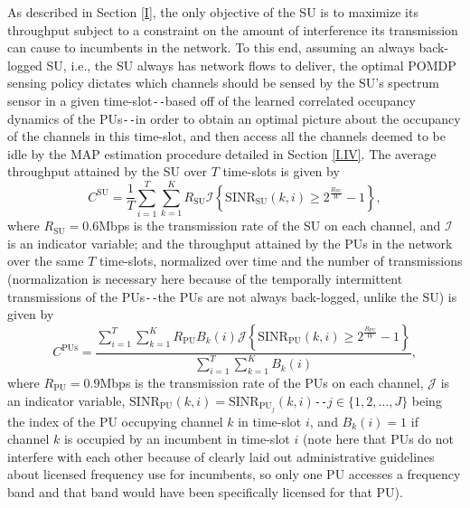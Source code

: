 \documentclass[12pt, draftcls, onecolumn]{IEEEtran}
\begin{document}
As described in Section \ref{I}, the only objective of the SU is to maximize its throughput subject to a constraint on the amount of interference its transmission can cause to incumbents in the network. To this end, assuming an always back-logged SU, i.e., the SU always has network flows to deliver, the optimal POMDP sensing policy dictates which channels should be sensed by the SU's spectrum sensor in a given time-slot\texttt{-{}-}based off of the learned correlated occupancy dynamics of the PUs\texttt{-{}-}in order to obtain an optimal picture about the occupancy of the channels in this time-slot, and then access all the channels deemed to be idle by the MAP estimation procedure detailed in Section \ref{I.IV}. The average throughput attained by the SU over $T$ time-slots is given by
\begin{equation}\label{30}
    C^{\text{SU}}=\frac{1}{T}\sum_{i=1}^{T}\sum_{k=1}^{K}R_{\text{SU}}\mathcal{I}\left\{\text{SINR}_{\text{SU}}(k,i) \geq 2^{\frac{R_{\text{SU}}}{W}}-1\right\},
\end{equation}
where $R_{\text{SU}}{=}0.6$Mbps is the transmission rate of the SU on each channel, and $\mathcal{I}$ is an indicator variable; and the throughput attained by the PUs in the network over the same $T$ time-slots, normalized over time and the number of transmissions (normalization is necessary here because of the temporally intermittent transmissions of the PUs\texttt{-{}-}the PUs are not always back-logged, unlike the SU) is given by
\begin{equation}\label{31}
    C^{\text{PUs}}=\frac{\sum_{i=1}^{T}\sum_{k=1}^{K}R_{\text{PU}}B_{k}(i)\mathcal{J}\left\{\text{SINR}_{\text{PU}}(k,i) \geq 2^{\frac{R_{\text{PU}}}{W}}-1\right\}}{\sum_{i=1}^{T}\sum_{k=1}^{K}B_{k}(i)},
\end{equation}
where $R_{\text{PU}}{=}0.9$Mbps is the transmission rate of the PUs on each channel, $\mathcal{J}$ is an indicator variable, $\text{SINR}_{\text{PU}}(k,i){=}\text{SINR}_{\text{PU}_{j}}(k,i)$\texttt{-{}-}$j{\in}\{1,2,\dots,J\}$ being the index of the PU occupying channel $k$ in time-slot $i$, and $B_{k}(i){=}1$ if channel $k$ is occupied by an incumbent in time-slot $i$ (note here that PUs do not interfere with each other because of clearly laid out administrative guidelines about licensed frequency use for incumbents, so only one PU accesses a frequency band and that band would have been specifically licensed for that PU).
\end{document}
